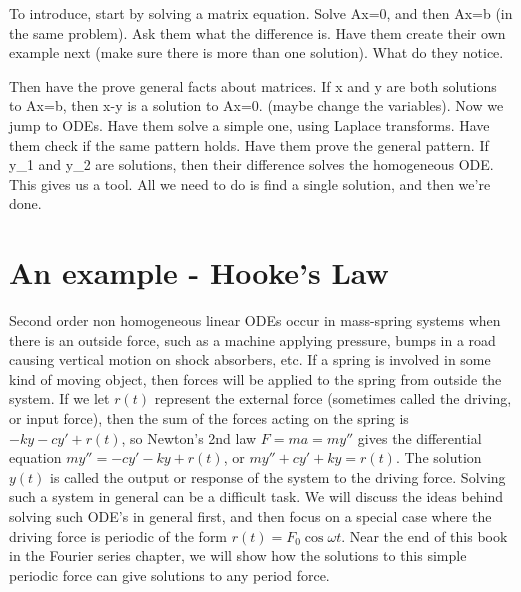 To introduce, start by solving a matrix equation.  Solve Ax=0, and then Ax=b (in the same problem).  Ask them what the difference is.  Have them create their own example next (make sure there is more than one solution).  What do they notice.

Then have the prove general facts about matrices.  If x and y are both solutions to Ax=b, then x-y is a solution to Ax=0.  (maybe change the variables). 
Now we jump to ODEs.  Have them solve a simple one, using Laplace transforms.  Have them check if the same pattern holds.
Have them prove the general pattern. If y_1 and y_2 are solutions, then their difference solves the homogeneous ODE.  
This gives us a tool.  All we need to do is find a single solution, and then we're done.




\section{An example - Hooke's Law}
Second order non homogeneous linear ODEs occur in mass-spring systems when there is an outside force, such as a machine applying pressure, bumps in a road causing vertical motion on shock absorbers, etc. If a spring is involved in some kind of moving object, then forces will be applied to the spring from outside the system. If we let $r(t)$ represent the external force (sometimes called the driving, or input force), then the sum of the forces acting on the spring is $-ky-cy'+r(t)$, so Newton's 2nd law $F=ma = my''$ gives the differential equation $my''=-cy'-ky+r(t)$, or $my''+cy'+ky=r(t)$.  The solution $y(t)$ is called the output or response of the system to the driving force.  Solving such a system in general can be a difficult task.  We will discuss the ideas behind solving such ODE's in general first, and then focus on a special case where the driving force is periodic of the form $r(t)=F_0\cos \omega t$. Near the end of this book in the Fourier series chapter, we will show how the solutions to this simple periodic force can give solutions to any period force. 

